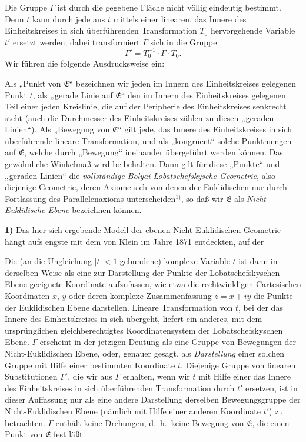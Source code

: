 \documentclass{article}
\begin{document}
Die Gruppe $\varGamma$ ist durch die gegebene Fläche nicht völlig eindeutig bestimmt. Denn $t$ kann durch jede aus $t$ mittels einer linearen, das Innere des Einheitskreises in sich überführenden Transformation $T_0$ hervorgehende Variable $t'$ ersetzt werden; dabei transformiert $\varGamma$ sich in die Gruppe
\[ \varGamma' = T_0^{-1} \cdot \varGamma \cdot T_0. \]
Wir führen die folgende Ausdrucksweise ein:

Als „Punkt von $\mathfrak{E}$“ bezeichnen wir jeden im Innern des Einheitskreises gelegenen Punkt $t$, als „gerade Linie auf $\mathfrak{E}$“ den im Innern des Einheitskreises gelegenen Teil einer jeden Kreislinie, die auf der Peripherie des Einheitskreises senkrecht steht (auch die Durchmesser des Einheitskreises zählen zu diesen „geraden Linien“). Als „Bewegung von $\mathfrak{E}$“ gilt jede, das Innere des Einheitskreises in sich überführende lineare Transformation, und als „kongruent“ solche Punktmengen auf $\mathfrak{E}$, welche durch „Bewegung“ ineinander übergeführt werden können. Das gewöhnliche Winkelmaß wird beibehalten. Dann gilt für diese „Punkte“ und „geraden Linien“ die \emph{vollständige Bolyai-Lobatschefskysche Geometrie}, also diejenige Geometrie, deren Axiome sich von denen der Euklidischen nur durch Fortlassung des Parallelenaxioms unterscheiden${}^{1)}$, so daß wir $\mathfrak{E}$ als \emph{Nicht-Euklidische Ebene} bezeichnen können.

\textbf{1)} Das hier sich ergebende Modell der ebenen Nicht-Euklidischen Geometrie hängt aufs engste mit dem von Klein im Jahre 1871 entdeckten, auf der

Die (an die Ungleichung $|t| < 1$ gebundene) komplexe Variable $t$ ist dann in derselben Weise als eine zur Darstellung der Punkte der Lobatschefskyschen Ebene geeignete Koordinate aufzufassen, wie etwa die rechtwinkligen Cartesischen Koordinaten $x$, $y$ oder deren komplexe Zusammenfassung $z = x + iy$ die Punkte der Euklidischen Ebene darstellen. Lineare Transformation von $t$, bei der das Innere des Einheitskreises in sich übergeht, liefert ein anderes, mit dem ursprünglichen gleichberechtigtes Koordinatensystem der Lobatschefskyschen Ebene. $\varGamma$ erscheint in der jetzigen Deutung als eine Gruppe von Bewegungen der Nicht-Euklidischen Ebene, oder, genauer gesagt, als \emph{Darstellung} einer solchen Gruppe mit Hilfe einer bestimmten Koordinate $t$. Diejenige Gruppe von linearen Substitutionen $\varGamma'$, die wir aus $\varGamma$ erhalten, wenn wir $t$ mit Hilfe einer das Innere des Einheitskreises in sich überführenden Transformation durch $t'$ ersetzen, ist in dieser Auffassung nur als eine andere Darstellung derselben Bewegungsgruppe der Nicht-Euklidischen Ebene (nämlich mit Hilfe einer anderen Koordinate $t'$) zu betrachten. $\varGamma$ enthält keine Drehungen, d.~h.\ keine Bewegung von $\mathfrak{E}$, die einen Punkt von $\mathfrak{E}$ fest läßt.
\end{document}
